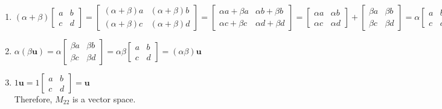 \documentclass{report}
\begin{document}
\begin{enumerate}
    \item 
    $
    (\alpha + \beta) 
    \begin{bmatrix}
        a & b \\
        c & d 
    \end{bmatrix}
    =
    \begin{bmatrix}
        (\alpha + \beta)a & (\alpha + \beta)b \\
        (\alpha + \beta)c & (\alpha + \beta)d
    \end{bmatrix}
    =
    \begin{bmatrix}
        \alpha a + \beta a & \alpha b + \beta b \\
        \alpha c + \beta c & \alpha d + \beta d
    \end{bmatrix}
    =
    \begin{bmatrix}
        \alpha a & \alpha b \\
        \alpha c & \alpha d
    \end{bmatrix}
    +
    \begin{bmatrix}
        \beta a & \beta b \\
        \beta c & \beta d
    \end{bmatrix}
    =
    \alpha
    \begin{bmatrix}
        a & b \\
        c & d
    \end{bmatrix}
    +
    \beta
    \begin{bmatrix}
        a & b \\
        c & d
    \end{bmatrix}
    =
    \alpha \bm{u} + \beta \bm{u}
    $

    \item $\alpha(\beta \bm{u}) = \alpha
    \begin{bmatrix}
        \beta a & \beta b \\
        \beta c & \beta d
    \end{bmatrix}
    =
    \alpha \beta
    \begin{bmatrix}
        a & b \\
        c & d
    \end{bmatrix}
    =
    (\alpha \beta) \bm{u}
    $

    \item $1 \bm{u} = 1
    \begin{bmatrix}
        a & b \\
        c & d
    \end{bmatrix}
    =
    \bm{u}$\\

    \noindent Therefore, $M_{22}$ is a vector space.
\end{enumerate}
\end{document}
